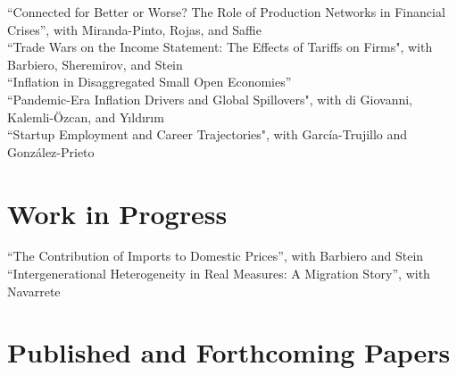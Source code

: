 \documentclass[10pt]{article}
\begin{document}
\noindent ``Connected for Better or Worse? The Role of Production Networks in Financial Crises'', with Miranda-Pinto, Rojas, and Saffie\\[-0.125in]

\noindent ``Trade Wars on the Income Statement: The Effects of Tariffs on Firms", with Barbiero, Sheremirov, and Stein\\[-0.125in]

\noindent ``Inflation in Disaggregated Small Open Economies''\\[-0.125in]


\noindent ``Pandemic-Era Inflation Drivers and Global Spillovers", with di Giovanni, Kalemli-\"{O}zcan, and Y{\i}ld{\i}r{\i}m \\[-0.125in]

\noindent ``Startup Employment and Career Trajectories", with Garc\'ia-Trujillo and Gonz\'alez-Prieto

\section*{Work in Progress}



\noindent ``The Contribution of Imports to Domestic Prices'', with Barbiero and Stein\\[-0.125in]


\noindent ``Intergenerational Heterogeneity in Real Measures: A Migration Story'', with Navarrete\\[-0.125in]










\section*{Published and Forthcoming Papers}
\end{document}
